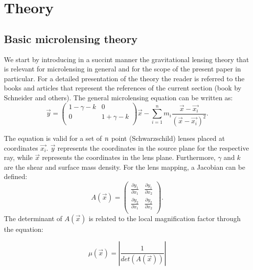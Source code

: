 
\section{Theory}

\subsection{Basic microlensing theory}

We start by introducing in a succint manner the gravitational lensing theory that is relevant for microlensing in general and for the scope of the
present paper in particular. For a detailed presentation of the theory the reader is referred to the books and articles that represent the references
of the current section (book by Schneider and others). The general microlensing equation can be written as:
\begin{equation}
\vec{y} =   
 \begin{pmatrix}
  1-\gamma - k & 0 \\
  0 & 1 + \gamma -k \\
 \end{pmatrix} 
\vec{x} - \sum_{i=1}^{n} m_i \frac{\vec{x} - \vec{x_i}}{\left( \vec{x} - \vec{x_i} \right)^2}.
\label{eqn:microlensingequation}
\end{equation} 

The equation is valid for a set of $\it{n}$ point (Schwarzschild) lenses placed at coordinates $\vec{x_i}$. $\vec{y}$ represents the coordinates in the source plane for the respective ray, while $\vec{x}$ represents the coordinates in the lens plane. Furthermore, $\gamma$ and $k$ are the shear and surface mass density. For the lens mapping, a Jacobian can be defined:
\begin{equation} 
A(\vec{x}) = 
 \begin{pmatrix}
  \frac{\partial{y_1}}{\partial{x_1}} & \frac{\partial{y_1}}{\partial{x_2}} \\
  \frac{\partial{y_2}}{\partial{x_1}} & \frac{\partial{y_2}}{\partial{x_2}} \\
 \end{pmatrix}. 
\end{equation}
The determinant of $A(\vec{x})$ is related to the local magnification factor through the equation:

\begin{equation}
\mu(\vec{x}) = \left| \frac{1}{det(A(\vec{x}))} \right|
\label{eqn:mu_x}
\end{equation}

